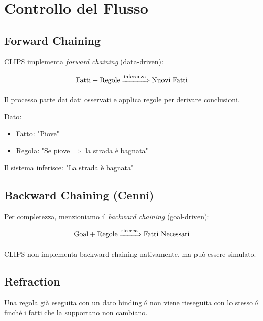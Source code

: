 \section{Controllo del Flusso}

\subsection{Forward Chaining}

CLIPS implementa \textit{forward chaining} (data-driven):

\begin{equation}
\text{Fatti} + \text{Regole} \xRightarrow{\text{inferenza}} \text{Nuovi Fatti}
\end{equation}

Il processo parte dai dati osservati e applica regole per derivare conclusioni.

\begin{esempio}
Dato:
\begin{itemize}
\item Fatto: "Piove"
\item Regola: "Se piove $\Rightarrow$ la strada è bagnata"
\end{itemize}

Il sistema inferisce: "La strada è bagnata"
\end{esempio}

\subsection{Backward Chaining (Cenni)}

Per completezza, menzioniamo il \textit{backward chaining} (goal-driven):

\begin{equation}
\text{Goal} + \text{Regole} \xRightarrow{\text{ricerca}} \text{Fatti Necessari}
\end{equation}

CLIPS non implementa backward chaining nativamente, ma può essere simulato.

\subsection{Refraction}

\begin{definizione}[Refraction]
Una regola già eseguita con un dato binding $\theta$ non viene rieseguita con lo stesso $\theta$ finché i fatti che la supportano non cambiano.
\end{definizione}

